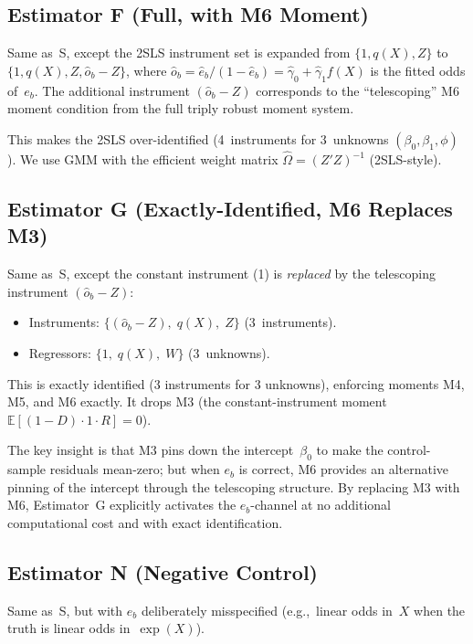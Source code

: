 \documentclass[11pt,letterpaper]{article}
\newcommand{\E}{\mathbb{E}}
\begin{document}
\subsection{Estimator F (Full, with M6 Moment)}

Same as~S, except the 2SLS instrument set is expanded from
$\{1, q(X), Z\}$ to $\{1, q(X), Z, \hat{o}_b - Z\}$, where
$\hat{o}_b = \hat{e}_b/(1-\hat{e}_b) = \hat\gamma_0 + \hat\gamma_1 f(X)$
is the fitted odds of~$e_b$.  The additional instrument
$(\hat{o}_b - Z)$ corresponds to the ``telescoping'' M6 moment condition
from the full triply robust moment system.

This makes the 2SLS over-identified (4~instruments for
3~unknowns $(\beta_0, \beta_1, \phi)$).  We use GMM with the efficient
weight matrix $\hat\Omega = (Z'Z)^{-1}$ (2SLS-style).


\subsection{Estimator G (Exactly-Identified, M6 Replaces M3)}

Same as~S, except the constant instrument (1) is \emph{replaced} by
the telescoping instrument $(\hat{o}_b - Z)$:
\begin{itemize}[nosep]
  \item Instruments: $\{(\hat{o}_b - Z),\; q(X),\; Z\}$ (3~instruments).
  \item Regressors: $\{1,\; q(X),\; W\}$ (3~unknowns).
\end{itemize}
This is exactly identified (3 instruments for 3 unknowns), enforcing
moments M4, M5, and M6 exactly.  It drops M3 (the constant-instrument
moment $\E[(1-D)\cdot 1 \cdot R] = 0$).

The key insight is that M3 pins down the intercept~$\beta_0$ to make
the control-sample residuals mean-zero; but when $e_b$ is correct, M6
provides an alternative pinning of the intercept through the
telescoping structure.  By replacing M3 with M6, Estimator~G
explicitly activates the $e_b$-channel at no additional computational
cost and with exact identification.


\subsection{Estimator N (Negative Control)}

Same as~S, but with $e_b$ deliberately misspecified (e.g.,\ linear
odds in~$X$ when the truth is linear odds in~$\exp(X)$).
\end{document}
